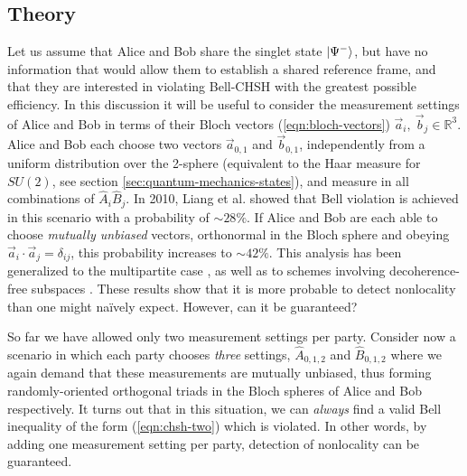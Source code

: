 \subsection{Theory}
Let us assume that Alice and Bob share 
the singlet state $\mbox{$ | \Psi^- \rangle $}$, but 
have no information that would allow them to establish a shared reference frame, and that they are interested in violating Bell-CHSH with the greatest possible efficiency. 
In this discussion it will be useful to consider the measurement settings of Alice and Bob in terms of their Bloch vectors (\ref{eqn:bloch-vectors}) $\vec{a}_i, ~\vec{b}_j \in \mathbb{R}^3$.
Alice and Bob each choose two vectors $\vec{a}_{0,1}$ and $\vec{b}_{0,1}$, independently from a uniform distribution over the 2-sphere (equivalent to the Haar measure for $SU(2)$, see section \ref{sec:quantum-mechanics-states}), and measure in all combinations of $\hat{A}_i \hat{B}_j$.  In 2010, Liang et al. showed \cite{Liang2010} that Bell violation is achieved in this scenario with a probability of $\sim 28\%$.  
If Alice and Bob are each able to choose \emph{mutually unbiased} vectors, orthonormal in the Bloch sphere and obeying $\vec{a}_i \cdot \vec{a}_j = \delta_{ij}$, this probability increases to $\sim 42 \%$. This analysis has been generalized to the multipartite case \cite{Liang2010, Wallman2011a}, as well as to schemes involving decoherence-free subspaces \cite{Cabello2003}. These results show that it is more probable to detect nonlocality than one might na\"ively expect. However, can it be guaranteed?

So far we have allowed only two measurement settings per party. 
Consider now a scenario in which each party chooses \emph{three} settings,
$\hat{A}_{0,1,2}$ and $\hat{B}_{0,1,2}$  where we again demand that these measurements are mutually unbiased, thus forming randomly-oriented orthogonal triads in the Bloch spheres of Alice and Bob respectively. It turns out that in this situation, we can \emph{always} find a valid Bell inequality of the form (\ref{eqn:chsh-two}) which is violated. In other words, by adding one measurement setting per party, detection of nonlocality can be guaranteed.

